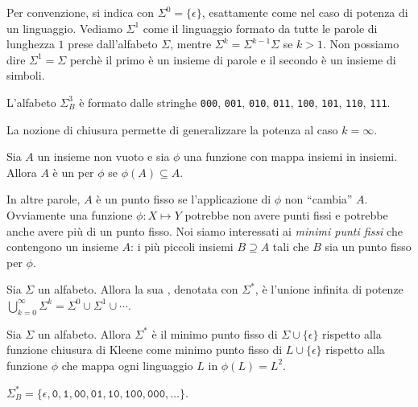 Per convenzione, si indica con $\Sigma^{0} = \{ \epsilon \}$, esattamente come nel caso di potenza di un linguaggio.
Vediamo $\Sigma^{1}$ come il linguaggio formato da tutte le parole di lunghezza $1$ prese dall'alfabeto
$\Sigma$, mentre $\Sigma^{k} = \Sigma^{k-1} \Sigma$ se $k>1$.
Non possiamo dire $\Sigma^{1} = \Sigma$ perchè il primo è un insieme di parole e il secondo è un
insieme di simboli.

\begin{example}\label{exa:L3}
L'alfabeto $\Sigma_{B}^{3}$ è formato dalle stringhe \texttt{000}, \texttt{001}, \texttt{010}, \texttt{011}, \texttt{100}, \texttt{101}, \texttt{110}, \texttt{111}.
\end{example}


La nozione di chiusura permette di generalizzare la potenza al caso $k=\infty$.




\begin{definition}\label{def:punto-fisso}
Sia $A$ un insieme non vuoto e sia $\phi$ una funzione con mappa insiemi in insiemi.
Allora $A$ è un  per $\phi$ se $\phi(A) \subseteq A$.
\end{definition}

In altre parole, $A$ è un punto fisso se l'applicazione di $\phi$ non ``cambia'' $A$.
Ovviamente una funzione $\phi: X\mapsto Y$ potrebbe non avere punti fissi e potrebbe anche avere più di un punto fisso.
Noi siamo interessati ai \emph{minimi punti fissi} che contengono un insieme $A$: i più piccoli insiemi $B\supseteq A$
tali che $B$ sia un punto fisso per $\phi$.

\begin{definition}\label{def:kleene}
Sia $\Sigma$ un alfabeto.
Allora la sua , denotata con $\Sigma^{*}$, è l'unione infinita di potenze
$\bigcup_{k=0}^{\infty} \Sigma^k = \Sigma^0 \cup \Sigma^1 \cup \cdots$.
\end{definition}

\begin{proposition}\label{prop:kleene-punto-fisso}
Sia $\Sigma$ un alfabeto.
Allora $\Sigma^{*}$ è il minimo punto fisso di $\Sigma \cup \{\epsilon\}$ rispetto alla funzione
chiusura di Kleene come minimo punto fisso di $L\cup \{\epsilon\}$ rispetto alla funzione $\phi$ che mappa ogni
linguaggio $L$ in $\phi(L) = L^{2}$.
\end{proposition}

\begin{example}\label{exa:chiusura-kleene}
$\Sigma_{B}^{*} = \{\mathtt{\epsilon},\mathtt{0},\mathtt{1},\mathtt{00},\mathtt{01},\mathtt{10},\mathtt{100},\mathtt{000},\ldots \}$.
\end{example}

